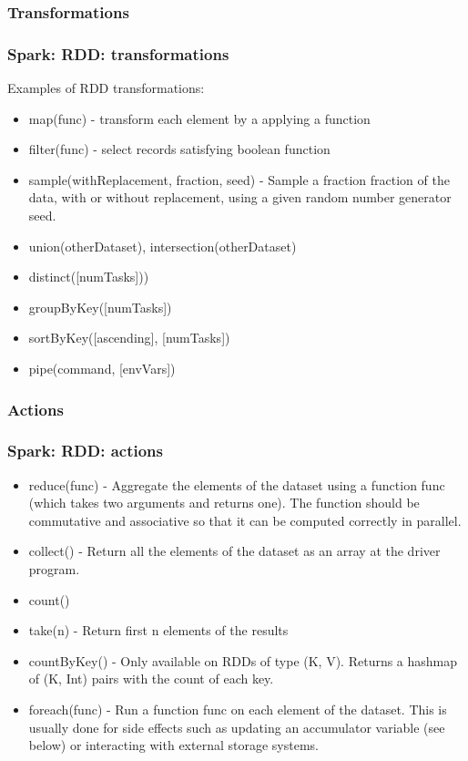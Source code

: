 \documentclass{beamer}
\begin{document}
\subsubsection{Transformations}
\begin{frame}
  \frametitle{Spark: RDD: transformations}
  Examples of RDD transformations:
  \begin{itemize}
  \item {\color{mycolorcode}map(func)} - transform each element by a applying a function
  \item {\color{mycolorcode}filter(func)} - select records satisfying boolean function
  \item {\color{mycolorcode}sample(withReplacement, fraction, seed)} - Sample a fraction fraction of the data, with or without replacement, using a given random number generator seed.
  \item {\color{mycolorcode}union(otherDataset), intersection(otherDataset)}
  \item {\color{mycolorcode}distinct([numTasks]))}
  \item {\color{mycolorcode}groupByKey([numTasks])}
  \item {\color{mycolorcode}sortByKey([ascending], [numTasks])}
  \item {\color{mycolorcode}pipe(command, [envVars])}
  \end{itemize}
\end{frame}

\subsubsection{Actions}
\begin{frame}
  \frametitle{Spark: RDD: actions}
  \begin{itemize}
  \item {\color{mycolorcode}reduce(func)} - Aggregate the elements of the dataset using a function func (which takes two arguments and returns one). The function should be commutative and associative so that it can be computed correctly in parallel.
  \item {\color{mycolorcode}collect()} - Return all the elements of the dataset as an array at the driver program.
  \item {\color{mycolorcode}count()}
  \item {\color{mycolorcode}take(n)} - Return first n elements of the results
  \item {\color{mycolorcode}countByKey()} - Only available on RDDs of type (K, V). Returns a hashmap of (K, Int) pairs with the count of each key.
  \item {\color{mycolorcode}foreach(func)} - Run a function func on each element of the dataset. This is usually done for side effects such as updating an accumulator variable (see below) or interacting with external storage systems.
  \end{itemize}
\end{frame}
\end{document}
